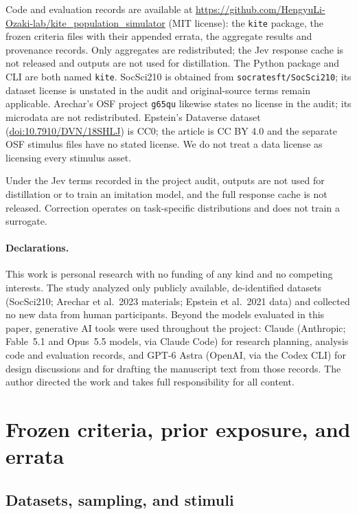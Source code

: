\documentclass[11pt]{article}
\begin{document}
Code and evaluation records are available at \url{https://github.com/HengyuLi-Ozaki-lab/kite_population_simulator} (MIT license): the \texttt{kite} package, the frozen criteria files with their appended errata, the aggregate results and provenance records. Only aggregates are redistributed; the Jev response cache is not released and outputs are not used for distillation. The Python package and CLI are both named \texttt{kite}. SocSci210 is obtained from \texttt{socratesft/SocSci210}; its dataset license is unstated in the audit and original-source terms remain applicable. Arechar's OSF project \texttt{g65qu} likewise states no license in the audit; its microdata are not redistributed. Epstein's Dataverse dataset (\href{https://doi.org/10.7910/DVN/18SHLJ}{doi:10.7910/DVN/18SHLJ}) is CC0; the article is CC BY 4.0 and the separate OSF stimulus files have no stated license. We do not treat a data license as licensing every stimulus asset.

Under the Jev terms recorded in the project audit, outputs are not used for distillation or to train an imitation model, and the full response cache is not released. Correction operates on task-specific distributions and does not train a surrogate.

\paragraph{Declarations.}
This work is personal research with no funding of any kind and no competing interests. The study analyzed only publicly available, de-identified datasets (SocSci210; Arechar et al.\ 2023 materials; Epstein et al.\ 2021 data) and collected no new data from human participants. Beyond the models evaluated in this paper, generative AI tools were used throughout the project: Claude (Anthropic; Fable~5.1 and Opus~5.5 models, via Claude Code) for research planning, analysis code and evaluation records, and GPT-6 Astra (OpenAI, via the Codex CLI) for design discussions and for drafting the manuscript text from those records. The author directed the work and takes full responsibility for all content.

\clearpage
\appendix
\section{Frozen criteria, prior exposure, and errata}\label{app:criteria}
\subsection{Datasets, sampling, and stimuli}\label{app:materials}
\end{document}
